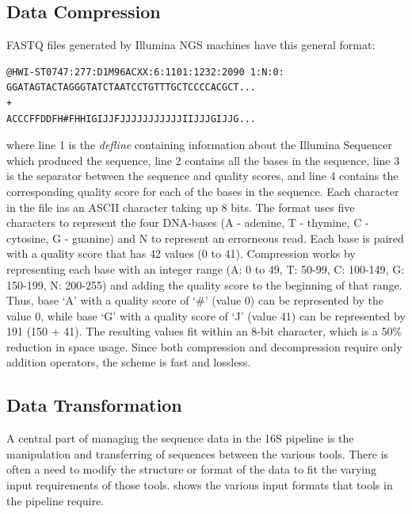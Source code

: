 \documentclass[12pt]{article}
\begin{document}

	\subsection{Data Compression} %
	\label{sub:data_compression}
	FASTQ files generated by Illumina NGS machines have this general format:
	
	\lstset{
		numbers=right
	}
	\begin{lstlisting}
@HWI-ST0747:277:D1M96ACXX:6:1101:1232:2090 1:N:0:
GGATAGTACTAGGGTATCTAATCCTGTTTGCTCCCCACGCT...
+
ACCCFFDDFH#FHHIGIJJFJJJJJJJJJJJIIJJJGIJJG...
	\end{lstlisting}
	where line 1 is the \emph{defline} containing information about the Illumina
	Sequencer which produced the sequence, line 2 contains all the bases in the 
	sequence, line 3 is the separator between the sequence and quality scores, and 
	line 4 contains the corresponding quality score for each of the bases in the 
	sequence. Each character in the file ias an ASCII character taking up 8 bits. 
	The format uses five characters to represent the four DNA-bases (A - adenine, T - thymine,
	C - cytosine, G - guanine) and N to represent an errorneous read. Each base is paired
	with a quality score that has 42 values (0 to 41). Compression works by representing
	each base with an integer range (A: 0 to 49, T: 50-99, C: 100-149, G: 150-199, N: 200-255)
	and adding the quality score to the beginning of that range. Thus, base `A' with a 
	quality score of `\#' (value 0) can be represented by the value 0, while base `G' with
	a quality score of `J' (value 41) can be represented by 191 (150 + 41). The resulting
	values fit within an 8-bit character, which is a 50\% reduction in space usage. 
	Since both compression and decompression require only addition operators, the scheme
	is fast and lossless.

	
	\subsection{Data Transformation} %
	\label{sec:data_transformation}
	A central part of managing the sequence data in the 16S pipeline is the manipulation
	and transferring of sequences between the various tools. There is often a need
	to modify the structure or format of the data to fit the varying input requirements
	of those tools.  shows the various input formats that
	tools in the pipeline require.
\end{document}
